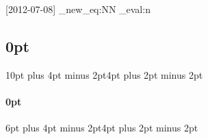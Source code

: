 \usepackage{expl3}[2012-07-08]
\ExplSyntaxOn
\cs_new_eq:NN \fpeval \fp_eval:n
\ExplSyntaxOff
\usepackage[english]{babel}
\usepackage[utf8]{inputenc}
\usepackage[top=3cm, bottom=3cm, left=2.5cm, right=2.5cm]{geometry}
\usepackage{titlesec}
\titlespacing\subsection{0pt}{10pt plus 4pt minus 2pt}{4pt plus 2pt minus 2pt}
\titlespacing\paragraph{0pt}{6pt plus 4pt minus 2pt}{4pt plus 2pt minus 2pt}


\usepackage[usenames,dvipsnames]{xcolor}
\usepackage[siunitx]{circuitikz}
\usepackage[colorinlistoftodos, color=orange!50]{todonotes}
\usepackage[colorlinks=true]{hyperref}
\usepackage{fancybox}
\usepackage{epsfig}
\usepackage{soul}
\usepackage[framemethod=tikz]{mdframed}
\usepackage{enumitem}
\usepackage{subcaption}

\usepackage{listings,lstautogobble}
\usepackage{color} %


\usepackage{amsfonts,amssymb,dsfont,amsmath,mathtools,amsthm,stmaryrd,bm,array}
    \theoremstyle{break} 
    \newtheorem{theorem}{Theorem}[section]
    \newtheorem{lemma}[theorem]{Lemma}
    \newtheorem{proposition}[theorem]{Proposition}
    \newtheorem{definition}[theorem]{Definition}
    \theoremstyle{break_rem}
    \newtheorem{remark}[theorem]{Remark}
    \newtheorem{corollary}[theorem]{Corollary}

\newcommand\independent{\protect\mathpalette{\protect\independenT}{\perp}}
\def\independenT#1#2{\mathrel{\rlap{$#1#2$}\mkern2mu{#1#2}}}

\usepackage{algorithm,algorithmic,eqparbox}
\renewcommand\algorithmiccomment[1]{\hfill\#\ \eqparbox{COMMENT}{#1}}

\usepackage{tikz,caption}
\usepackage{graphicx}

